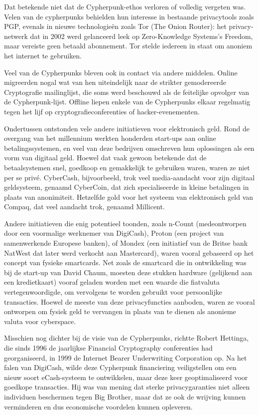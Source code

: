 \documentclass[smalldemyvopaper,11pt,twoside,onecolumn,openright,extrafontsizes,hidelinks]{memoir}
\begin{document}
Dat betekende niet dat de Cypherpunk-ethos verloren of volledig vergeten
was. Velen van de cypherpunks behielden hun interesse in bestaande
privacytools zoals PGP, evenals in nieuwe technologieën zoals Tor (The
Onion Router): het privacy-netwerk dat in 2002 werd gelanceerd leek op
Zero-Knowledge Systems's Freedom, maar vereiste geen betaald abonnement.
Tor stelde iedereen in staat om anoniem het internet te gebruiken.

Veel van de Cypherpunks bleven ook in contact via andere middelen.
Online migreerden nogal wat van hen uiteindelijk naar de strikter
gemodereerde Cryptografie mailinglijst, die soms werd beschouwd als de
feitelijke opvolger van de Cypherpunk-lijst. Offline liepen enkele van
de Cypherpunks elkaar regelmatig tegen het lijf op
cryptografieconferenties of hacker-evenementen.

Ondertussen ontstonden vele andere initiatieven voor elektronisch geld.
Rond de overgang van het millennium werkten honderden start-ups aan
online betalingssystemen, en veel van deze bedrijven omschreven hun
oplossingen als een vorm van digitaal geld. Hoewel dat vaak gewoon
betekende dat de betaalsystemen snel, goedkoop en gemakkelijk te
gebruiken waren, waren ze niet per se privé. CyberCash, bijvoorbeeld,
trok veel media-aandacht voor zijn digitaal geldsysteem, genaamd
CyberCoin, dat zich specialiseerde in kleine betalingen in plaats van
anonimiteit. Hetzelfde gold voor het systeem van elektronisch geld van
Compaq, dat veel aandacht trok, genaamd Millicent.

Andere initiatieven die enig potentieel toonden, zoals n-Count
(medeontworpen door een voormalige werknemer van DigiCash), Proton (een
project van samenwerkende Europese banken), of Mondex (een initiatief
van de Britse bank NatWest dat later werd verkocht aan Mastercard),
waren vooral gebaseerd op het concept van fysieke smartcards. Net zoals
de smartcard die in ontwikkeling was bij de start-up van David Chaum,
moesten deze stukken hardware (gelijkend aan een kredietkaart) vooraf
geladen worden met een waarde die fiatvaluta vertegenwoordigde, om
vervolgens te worden gebruikt voor persoonlijke transacties. Hoewel de
meeste van deze privacyfuncties aanboden, waren ze vooral ontworpen om
fysiek geld te vervangen in plaats van te dienen als anonieme valuta
voor cyberspace.

Misschien nog dichter bij de visie van de Cypherpunks, richtte Robert
Hettinga, die sinds 1996 de jaarlijkse Financial Cryptography
conferenties had georganiseerd, in 1999 de Internet Bearer Underwriting
Corporation op. Na het falen van DigiCash, wilde deze Cypherpunk
financiering veiligstellen om een nieuw soort eCash-systeem te
ontwikkelen, maar deze keer geoptimaliseerd voor goedkope transacties.
Hij was van mening dat sterke privacygaranties niet alleen individuen
beschermen tegen Big Brother, maar dat ze ook de wrijving kunnen
verminderen en dus economische voordelen kunnen opleveren.
\end{document}
